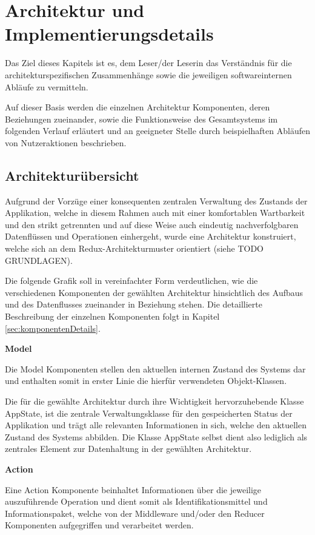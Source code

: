 \documentclass[bibliography=totoc,listof=totoc,BCOR=5mm,DIV=12,oneside]{scrbook}
\begin{document}
\newpage
\chapter{Architektur und Implementierungsdetails} \label{chap:architektur}
\par Das Ziel dieses Kapitels ist es, dem Leser/der Leserin das Verständnis für die architekturspezifischen Zusammenhänge sowie die jeweiligen softwareinternen Abläufe zu vermitteln. 
\par Auf dieser Basis werden die einzelnen Architektur Komponenten, deren Beziehungen zueinander, sowie die Funktionsweise des Gesamtsystems im folgenden Verlauf erläutert und an geeigneter Stelle durch beispielhaften Abläufen von Nutzeraktionen beschrieben.

\section{Architekturübersicht}
\par Aufgrund der Vorzüge einer konsequenten zentralen Verwaltung des Zustands der Applikation, welche in diesem Rahmen auch mit einer komfortablen Wartbarkeit und den strikt getrennten und auf diese Weise auch eindeutig nachverfolgbaren Datenflüssen und Operationen einhergeht, wurde eine Architektur konstruiert, welche sich an dem Redux-Architekturmuster orientiert (siehe TODO GRUNDLAGEN). 
\par Die folgende Grafik soll in vereinfachter Form verdeutlichen, wie die verschiedenen Komponenten der gewählten Architektur hinsichtlich des Aufbaus und des Datenflusses zueinander in Beziehung stehen. Die detaillierte Beschreibung der einzelnen Komponenten folgt in Kapitel \ref{sec:komponentenDetails}.

\par \bigskip \textbf{Model}
\par Die Model Komponenten stellen den aktuellen internen Zustand des Systems dar und enthalten somit in erster Linie die hierfür verwendeten Objekt-Klassen.
\par Die für die gewählte Architektur durch ihre Wichtigkeit hervorzuhebende Klasse AppState, ist die zentrale Verwaltungsklasse für den gespeicherten Status der Applikation und trägt alle relevanten Informationen in sich, welche den aktuellen Zustand des Systems abbilden. Die Klasse AppState selbst dient also lediglich als zentrales Element zur Datenhaltung in der gewählten Architektur.

\par \bigskip \textbf{Action}
\par Eine Action Komponente beinhaltet Informationen über die jeweilige auszuführende Operation und dient somit als Identifikationsmittel und Informationspaket, welche von der Middleware und/oder den Reducer Komponenten aufgegriffen und verarbeitet werden.
\end{document}
